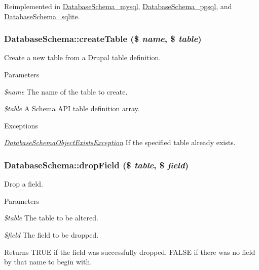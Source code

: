 Reimplemented in \hyperlink{classDatabaseSchema__mysql_a7da23695df0408c0b8d0bbb95bf32ef6}{DatabaseSchema\_\-mysql}, \hyperlink{classDatabaseSchema__pgsql_adae800c8871e30a70f3896b730c12ed3}{DatabaseSchema\_\-pgsql}, and \hyperlink{classDatabaseSchema__sqlite_ada4db729f33e2ac55a9d886f30b7b3ad}{DatabaseSchema\_\-sqlite}.\hypertarget{classDatabaseSchema_a0117d8198d2da93013fe5bf823649fd6}{
\subsubsection[{createTable}]{\setlength{\rightskip}{0pt plus 5cm}DatabaseSchema::createTable (\$ {\em name}, \/  \$ {\em table})}}
\label{classDatabaseSchema_a0117d8198d2da93013fe5bf823649fd6}
Create a new table from a Drupal table definition.


\begin{DoxyParams}{Parameters}
\item[{\em \$name}]The name of the table to create. \item[{\em \$table}]A Schema API table definition array.\end{DoxyParams}

\begin{DoxyExceptions}{Exceptions}
\item[{\em \hyperlink{classDatabaseSchemaObjectExistsException}{DatabaseSchemaObjectExistsException}}]If the specified table already exists. \end{DoxyExceptions}
\hypertarget{classDatabaseSchema_a9eee3ae81e40bba206015a83450e1d56}{
\subsubsection[{dropField}]{\setlength{\rightskip}{0pt plus 5cm}DatabaseSchema::dropField (\$ {\em table}, \/  \$ {\em field})}}
\label{classDatabaseSchema_a9eee3ae81e40bba206015a83450e1d56}
Drop a field.


\begin{DoxyParams}{Parameters}
\item[{\em \$table}]The table to be altered. \item[{\em \$field}]The field to be dropped.\end{DoxyParams}
\begin{DoxyReturn}{Returns}
TRUE if the field was successfully dropped, FALSE if there was no field by that name to begin with. 
\end{DoxyReturn}


